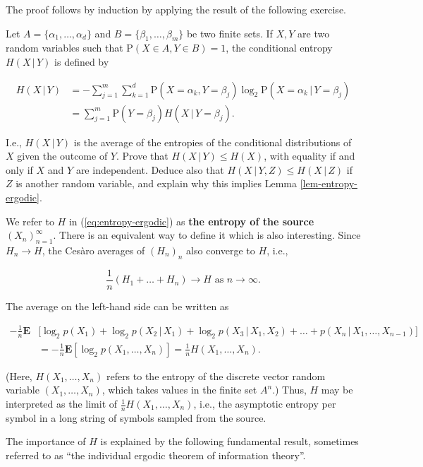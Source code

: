 \noindent The proof follows by induction by applying the result
of the following exercise.

\begin{xexercise}
Let $A=\{\alpha_1,\ldots,\alpha_d \}$ and
$B=\{\beta_1,\ldots,\beta_m \}$ be two finite sets.
If $X,Y$ are two random variables such that
$\mathrm{P}(X\in A, Y\in B)=1$, the conditional
entropy $H(X\,|\,Y)$ is defined by

\begin{align*}
H(X\,|\,Y) &= -\sum_{j=1}^m \sum_{k=1}^d \mathrm{P}(X=\alpha_k, Y=\beta_j) \log_2 \mathrm{P}(X = \alpha_k\,|\,Y=\beta_j) \\
&= \sum_{j=1}^m \mathrm{P}(Y=\beta_j) H(X\,|\,Y=\beta_j).
\end{align*}

\noindent I.e., $H(X\,|\,Y)$ is the average of the entropies of
the conditional distributions of $X$ given the
outcome of $Y$. Prove that $H(X\,|\,Y) \le H(X)$,
with equality if and only if $X$ and $Y$ are
independent. Deduce also that
$H(X\,|\,Y,Z) \le H(X\,|\,Z)$ if $Z$ is another
random variable, and explain why this implies Lemma
\ref{lem-entropy-ergodic}.
\end{xexercise}

\noindent We refer to $H$ in (\ref{eq:entropy-ergodic}) as \textbf{the
entropy of the source $(X_n)_{n=1}^\infty$}. There is
an equivalent way to define it which is also
interesting. Since $H_n\to H$, the Ces\`aro averages
of $(H_n)_n$ also converge to $H$, i.e.,

\[
\frac{1}{n}(H_1+\ldots+H_n) \to H \textrm{ as }n\to\infty.
\]

\noindent The average on the left-hand side can be written as

\begin{align*}
-\frac1n \mathbf{E}&\Big[ \log_2 p(X_1) + \log_2 p(X_2\,|\,X_1)
+ \log_2 p(X_3\,|\,X_1,X_2) + \ldots + p(X_n\,|\,X_1,\ldots,X_{n-1}) \Big] \\
&= -\frac1n \mathbf{E} \left[\log_2 p(X_1,\ldots,X_n)\right] = \frac{1}{n}H(X_1,\ldots,X_n).
\end{align*}

\noindent (Here, $H(X_1,\ldots,X_n)$ refers to the entropy of
the discrete vector random variable
$(X_1,\ldots,X_n)$, which takes values in the finite
set $A^n$.) Thus, $H$ may be interpreted as the limit
of $\frac{1}{n} H(X_1,\ldots,X_n)$, i.e., the
asymptotic entropy per symbol in a long string of
symbols sampled from the source.

The importance of $H$ is explained by the following
fundamental result, sometimes referred to as ``the
individual ergodic theorem of information theory''.

